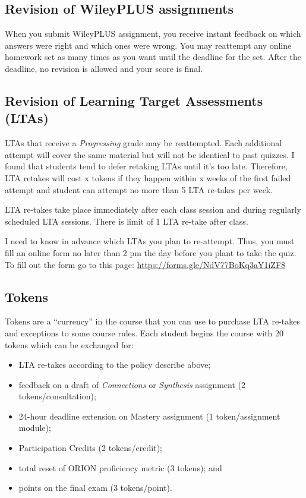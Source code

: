 \hypertarget{revision-of-wileyplus-assignments}{%
\subsection{Revision of WileyPLUS
assignments}\label{revision-of-wileyplus-assignments}}

When you submit WileyPLUS assignment, you receive instant feedback on
which answers were right and which ones were wrong. You may reattempt
any online homework set as many times as you want until the deadline for
the set. After the deadline, no revision is allowed and your score is
final.

\hypertarget{revision-of-learning-target-assessments-ltas}{%
\subsection{Revision of Learning Target Assessments
(LTAs)}\label{revision-of-learning-target-assessments-ltas}}

LTAs that receive a \emph{Progressing} grade may be reattempted. Each
additional attempt will cover the same material but will not be
identical to past quizzes. I found that students tend to defer retaking
LTAs until it's too late. Therefore, LTA retakes will cost x tokens if
they happen within x weeks of the first failed attempt and student can
attempt no more than 5 LTA re-takes per week.

LTA re-takes take place immediately after each class session and during
regularly scheduled LTA sessions. There is limit of 1 LTA re-take after
class.

I need to know in advance which LTAs you plan to re-attempt. Thus, you
must fill an online form no later than 2 pm the day before you plant to
take the quiz. To fill out the form go to this page:
\url{https://forms.gle/NdV77BoKq3aY1iZF8}

\hypertarget{tokens}{%
\subsection{Tokens}\label{tokens}}

Tokens are a ``currency'' in the course that you can use to purchase LTA
re-takes and exceptions to some course rules. Each student begins the
course with 20 tokens which can be exchanged for:

\begin{itemize}
\tightlist
\item
  LTA re-takes according to the policy describe above;
\item
  feedback on a draft of \emph{Connections} or \emph{Synthesis}
  assignment (2 tokens/consultation);
\item
  24-hour deadline extension on Mastery assignment (1 token/assignment
  module);
\item
  Participation Credits (2 tokens/credit);
\item
  total reset of ORION proficiency metric (3 tokens); and
\item
  points on the final exam (3 tokens/point).
\end{itemize}

